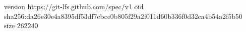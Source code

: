 version https://git-lfs.github.com/spec/v1
oid sha256:da26e30e4a8395df53df7cbce0b805f29a2f011d60b336f0d32ca4b54a2f5b50
size 262240
